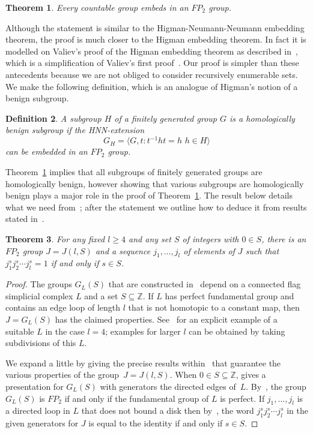 \documentclass[12pt,a4paper]{article}
\newtheorem{theorem}{Theorem}[section]
\newtheorem{definition}[theorem]{Definition}
\newcommand{\zz}{{\mathbb Z}}
\begin{document}
\begin{theorem}\label{thm:main}
Every countable group embeds in an $FP_2$ group.  
\end{theorem} 

Although the statement is similar to the Higman-Neumann-Neumann
embedding theorem, the proof is much closer to the Higman embedding 
theorem.   In fact it is modelled on Valiev's proof of the 
Higman embedding theorem as described in~\cite[Sec.~IV.7]{lynsch},
which is a simplification of Valiev's first proof~\cite{valiev}. 
Our proof is simpler than these antecedents because we are 
not obliged to consider recursively enumerable sets.  We make the following 
definition, which is an analogue of Higman's notion of a benign
subgroup.  

\begin{definition} 
A subgroup $H$ of a finitely generated group $G$ is a 
{\sl homologically benign subgroup}  if the HNN-extension 
$$G_H=\langle G,t\colon t^{-1}ht=h\,\, h\in H\rangle$$ 
can be embedded in an $FP_2$ group.  
\end{definition} 

Theorem~\ref{thm:main} implies that all subgroups of finitely
generated groups are homologically benign, however showing that
various subgroups are homologically benign plays a major role in the
proof of Theorem~\ref{thm:main}.  The result below details what we
need from~\cite{ufp}; after the statement we outline how to deduce it
from results stated in~\cite{ufp}.

\begin{theorem}\label{thm:fromufp} 
For any fixed $l\geq 4$ and any set $S$ of integers with $0\in S$,
there is an $FP_2$ group $J=J(l,S)$ and a sequence $j_1,\ldots,j_l$ of
elements of $J$ such that $j_1^sj_2^s\cdots j_l^s=1$ if and only if
$s\in S$.
\end{theorem}

\begin{proof} 
The groups $G_L(S)$ that are constructed in~\cite{ufp} depend on a
connected flag simplicial complex $L$ and a set $S\subseteq \zz$.  If
$L$ has perfect fundamental group and contains an edge loop of length
$l$ that is not homotopic to a constant map, then $J=G_L(S)$ has the
claimed properties.  See~\cite[section~2]{ufp} for an explicit example
of a suitable $L$ in the case $l=4$; examples for larger $l$ can be
obtained by taking subdivisions of this $L$.

We expand a little by giving the precise results within~\cite{ufp}
that guarantee the various properties of the group~$J=J(l,S)$.  When
$0\in S\subseteq \zz$, \cite[theorem~1.2]{ufp} gives a presentation for
$G_L(S)$ with generators the directed edges of~$L$.
By~\cite[theorem~1.3]{ufp}, the group $G_L(S)$ is $FP_2$ if and only if
the fundamental group of $L$ is perfect.  If $j_1,\ldots,j_l$ is a
directed loop in $L$ that does not bound a disk then
by~\cite[Lemma~14.4]{ufp}, the word $j_1^sj_2^s\cdots j_l^s$ in the 
given generators for $J$ is equal to
the identity if and only if $s\in S$.
\end{proof} 
\end{document}
